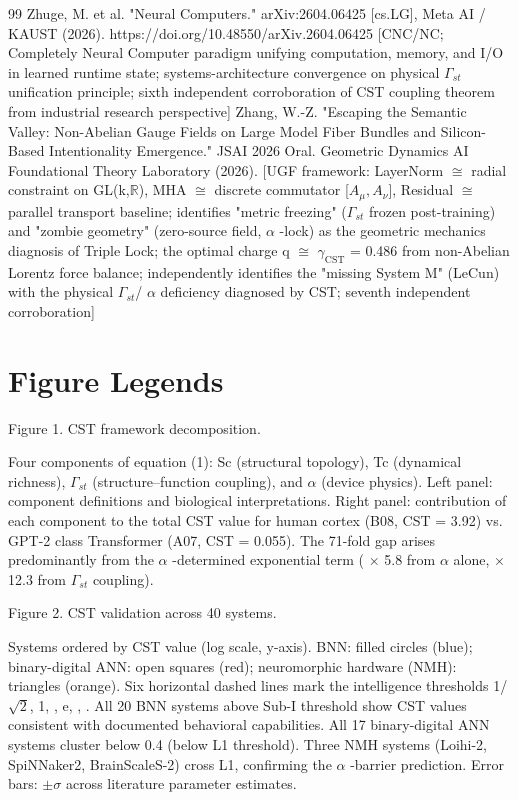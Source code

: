 \documentclass[a4paper,12pt]{article}
\begin{document}
\begin{thebibliography}{99}
 Zhuge, M. et al. "Neural Computers." arXiv:2604.06425 [cs.LG], Meta AI / KAUST (2026). https://doi.org/10.48550/arXiv.2604.06425 [CNC/NC; Completely Neural Computer paradigm unifying computation, memory, and I/O in learned runtime state; systems-architecture convergence on physical $\Gamma_{st}$ unification principle; sixth independent corroboration of CST coupling theorem from industrial research perspective]
 Zhang, W.-Z. "Escaping the Semantic Valley: Non-Abelian Gauge Fields on Large Model Fiber Bundles and Silicon-Based Intentionality Emergence." JSAI 2026 Oral.
Geometric Dynamics AI Foundational Theory Laboratory (2026). [UGF framework: LayerNorm $\cong$ radial constraint on GL(k,$\mathbb{R}$), MHA $\cong$ discrete commutator [$A_{\mu}, A_{\nu}$], Residual $\cong$ parallel transport baseline; identifies "metric freezing" ($\Gamma_{st}$ frozen post-training) and "zombie geometry" (zero-source field,  $\alpha$ -lock) as the geometric mechanics diagnosis of Triple Lock; the optimal charge q
$\cong$ $\gamma_{\text{CST}}$ = 0.486 from non-Abelian Lorentz force balance; independently identifies the "missing System M" (LeCun) with the physical $\Gamma_{st}$/ $\alpha$  deficiency diagnosed by CST; seventh independent corroboration]
\end{thebibliography}

\section*{Figure Legends}
Figure 1. CST framework decomposition.

Four components of equation (1): Sc (structural topology), Tc (dynamical richness), $\Gamma_{st}$ (structure--function coupling), and  $\alpha$  (device physics).
Left panel: component definitions and biological interpretations.
Right panel: contribution of each component to the total CST value for human cortex (B08, CST = 3.92) vs.
GPT-2 class Transformer (A07, CST = 0.055).
The 71-fold gap arises predominantly from the  $\alpha$ -determined exponential term ( $\times$ 5.8 from  $\alpha$  alone,  $\times$ 12.3 from $\Gamma_{st}$ coupling).

Figure 2. CST validation across 40 systems.

Systems ordered by CST value (log scale, y-axis).
BNN: filled circles (blue); binary-digital ANN: open squares (red); neuromorphic hardware (NMH): triangles (orange).
Six horizontal dashed lines mark the intelligence thresholds {1/$\sqrt{2}$, 1,  \phi , e,  \pi ,  \delta }.
All 20 BNN systems above Sub-I threshold show CST values consistent with documented behavioral capabilities.
All 17 binary-digital ANN systems cluster below 0.4 (below L1 threshold).
Three NMH systems (Loihi-2, SpiNNaker2, BrainScaleS-2) cross L1, confirming the  $\alpha$ -barrier prediction.
Error bars: $\pm\sigma$ across literature parameter estimates.
\end{document}
